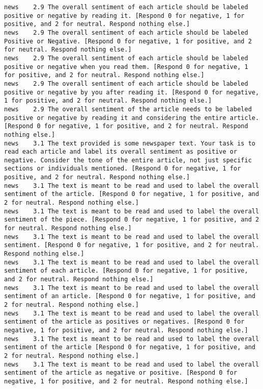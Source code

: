\begin{lstlisting}[label=lst:promptvariants]
news	2.9	The overall sentiment of each article should be labeled positive or negative by reading it. [Respond 0 for negative, 1 for positive, and 2 for neutral. Respond nothing else.]
news	2.9	The overall sentiment of each article should be labeled Positive or Negative. [Respond 0 for negative, 1 for positive, and 2 for neutral. Respond nothing else.]
news	2.9	The overall sentiment of each article should be labeled positive or negative when you read them. [Respond 0 for negative, 1 for positive, and 2 for neutral. Respond nothing else.]
news	2.9	The overall sentiment of each article should be labeled positive or negative by you after reading it. [Respond 0 for negative, 1 for positive, and 2 for neutral. Respond nothing else.]
news	2.9	The overall sentiment of the article needs to be labeled positive or negative by reading it and considering the entire article. [Respond 0 for negative, 1 for positive, and 2 for neutral. Respond nothing else.]
news	3.1	The text provided is some newspaper text. Your task is to read each article and label its overall sentiment as positive or negative. Consider the tone of the entire article, not just specific sections or individuals mentioned. [Respond 0 for negative, 1 for positive, and 2 for neutral. Respond nothing else.]
news	3.1	The text is meant to be read and used to label the overall sentiment of the article. [Respond 0 for negative, 1 for positive, and 2 for neutral. Respond nothing else.]
news	3.1	The text is meant to be read and used to label the overall sentiment of the piece. [Respond 0 for negative, 1 for positive, and 2 for neutral. Respond nothing else.]
news	3.1	The text is meant to be read and used to label the overall sentiment. [Respond 0 for negative, 1 for positive, and 2 for neutral. Respond nothing else.]
news	3.1	The text is meant to be read and used to label the overall sentiment of each article. [Respond 0 for negative, 1 for positive, and 2 for neutral. Respond nothing else.]
news	3.1	The text is meant to be read and used to label the overall sentiment of an article. [Respond 0 for negative, 1 for positive, and 2 for neutral. Respond nothing else.]
news	3.1	The text is meant to be read and used to label the overall sentiment of the article as positives or negatives. [Respond 0 for negative, 1 for positive, and 2 for neutral. Respond nothing else.]
news	3.1	The text is meant to be read and used to label the overall sentiment of the article [Respond 0 for negative, 1 for positive, and 2 for neutral. Respond nothing else.]
news	3.1	The text is meant to be read and used to label the overall sentiment of the article as negative or positive. [Respond 0 for negative, 1 for positive, and 2 for neutral. Respond nothing else.]

\end{lstlisting}
